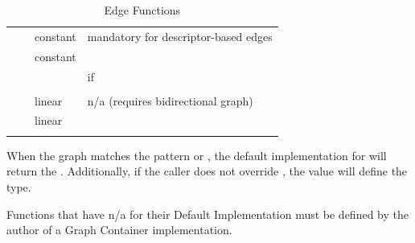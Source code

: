 \begin{table}[h!]
\begin{center}
{\begin{tabular}{l l p{1.3cm} L{6.9cm}}
\hdashline
     &  & constant & mandatory for descriptor-based edges \\
     &  & constant &  \\
                         &                     &          & if  \\
                         &                     &          & \hspace{3mm} \\
\hdashline
     &  & linear & n/a (requires bidirectional graph) \\
     &  & linear &  \\
                                        &              &        &  \\
\hline
\end{tabular}}
\caption{Edge Functions}
\label{tab:edge_func}
\end{center}
\end{table}

When the graph matches the pattern  or ,
the default implementation for  will return the . Additionally, if the caller does not override 
, the  value will define the  type.

Functions that have n/a for their Default Implementation must be defined by the author of a Graph Container implementation. 

